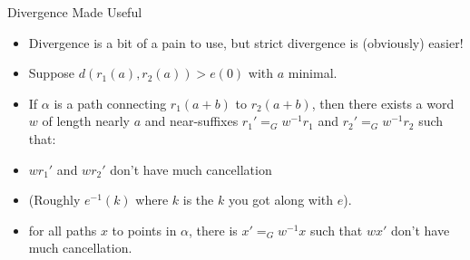 \documentclass{beamer}
\begin{document}
\begin{frame}{Divergence Made Useful}
	\begin{itemize}
		\item Divergence is a bit of a pain to use, but strict divergence is (obviously) easier!
		\item Suppose $d(r_1(a), r_2(a)) > e(0)$ with $a$ minimal.
		\item If $\alpha$ is a path connecting $r_1(a+b)$ to $r_2(a+b)$, then there exists a word $w$ of length nearly $a$ and near-suffixes $r_1' =_G w^{-1}r_1$ and $r_2' =_G w^{-1}r_2$ such that:
		\pause
		\item $wr_1'$ and $wr_2'$ don't have much cancellation
		\item (Roughly $e^{-1}(k)$ where $k$ is the $k$ you got along with $e$).
		\pause
		\item for all paths $x$ to points in $\alpha$, there is $x' =_G w^{-1}x$ such that $wx'$ don't have much cancellation.
	\end{itemize}
\end{frame}
\end{document}
